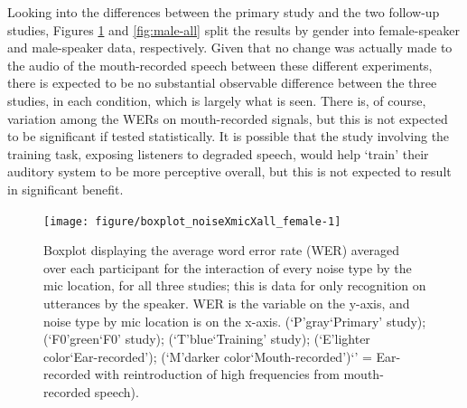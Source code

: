 Looking into the differences between the primary study and the two follow-up studies, Figures \ref{fig:female-all} and \ref{fig:male-all} split the results by gender into female-speaker and male-speaker data, respectively.  Given that no change was actually made to the audio of the mouth-recorded speech between these different experiments, there is expected to be no substantial observable difference between the three studies, in each \DIFaddbegin {}\DIFaddend condition, which is largely what is seen.  There is, of course, variation among the WERs on mouth-recorded signals, but this is not expected to be significant if tested statistically.  It is possible that the study involving the training task, exposing listeners to degraded speech, would help `train' their auditory system to be more perceptive overall, but this is not expected to result in significant benefit.




\begin{figure}[h!]
\DIFaddbeginFL \centering
\DIFaddendFL 

\texttt{[image: figure/boxplot\_noiseXmicXall\_female-1]} 

\caption{Boxplot displaying the average word error rate (WER) averaged over each participant for the interaction of every noise type by the mic location, for all three studies; this is data for only recognition on utterances by the \DIFdelbeginFL {}\DIFdelendFL \DIFaddbeginFL \textbf{} \DIFaddendFL speaker. WER is the variable on the y-axis, and noise type by mic location is on the x-axis. (`P'\DIFdelbeginFL \DIFdelFL{,}\DIFdelendFL \DIFaddbeginFL \DIFaddFL{=}\DIFaddendFL gray\DIFdelbeginFL \DIFdelFL{,}\DIFdelendFL \DIFaddbeginFL \DIFaddFL{=}\DIFaddendFL `Primary' study); (`F0'\DIFdelbeginFL \DIFdelFL{,}\DIFdelendFL \DIFaddbeginFL \DIFaddFL{=}\DIFaddendFL green\DIFdelbeginFL \DIFdelFL{,}\DIFdelendFL \DIFaddbeginFL \DIFaddFL{=}\DIFaddendFL `F0' study); (`T'\DIFdelbeginFL \DIFdelFL{,}\DIFdelendFL \DIFaddbeginFL \DIFaddFL{=}\DIFaddendFL blue\DIFdelbeginFL \DIFdelFL{,}\DIFdelendFL \DIFaddbeginFL \DIFaddFL{=}\DIFaddendFL `Training' study); (`E'\DIFdelbeginFL \DIFdelFL{,}\DIFdelendFL \DIFaddbeginFL \DIFaddFL{=}\DIFaddendFL lighter color\DIFdelbeginFL \DIFdelFL{,}\DIFdelendFL \DIFaddbeginFL \DIFaddFL{=}\DIFaddendFL `Ear-recorded'); (`M'\DIFdelbeginFL \DIFdelFL{,}\DIFdelendFL \DIFaddbeginFL \DIFaddFL{=}\DIFaddendFL darker color\DIFdelbeginFL \DIFdelFL{,}\DIFdelendFL \DIFaddbeginFL \DIFaddFL{=}\DIFaddendFL `Mouth-recorded')\DIFdelbeginFL {}\DIFdelendFL \DIFaddbeginFL \DIFaddFL{; (}\DIFaddendFL `\DIFdelbeginFL {}\DIFdelendFL \DIFaddbeginFL {}\DIFaddendFL ' = Ear-recorded \DIFaddbeginFL {}\DIFaddendFL with reintroduction of high frequencies \DIFdelbeginFL \DIFdelFL{(}\DIFdelendFL from mouth-recorded speech).}
\label{fig:female-all}
\end{figure}

